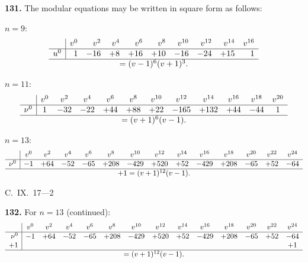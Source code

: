 \documentclass[11pt,a4paper]{book}
\begin{document}
\newpage
\noindent\textbf{131.} The modular equations may be written in square form as follows:

\medskip
$n = 9$:
\[
\begin{array}{r|rrrrrrrrr}
& v^0 & v^2 & v^4 & v^6 & v^8 & v^{10} & v^{12} & v^{14} & v^{16} \\
\hline
u^0 & 1 & -16 & +8 & +16 & +10 & -16 & -24 & +15 & 1 \\
\hline
\multicolumn{10}{c}{= (v - 1)^6(v + 1)^3.}
\end{array}
\]

\medskip
$n = 11$:
\[
\begin{array}{r|ccccccccccc}
& v^0 & v^2 & v^4 & v^6 & v^8 & v^{10} & v^{12} & v^{14} & v^{16} & v^{18} & v^{20} \\
\hline
\nu^0 & 1 & -32 & -22 & +44 & +88 & +22 & -165 & +132 & +44 & -44 & 1 \\
\hline
\multicolumn{12}{c}{= (v + 1)^6(v - 1).}
\end{array}
\]

\medskip
$n = 13$:
\[
\begin{array}{r|ccccccccccccc}
& v^0 & v^2 & v^4 & v^6 & v^8 & v^{10} & v^{12} & v^{14} & v^{16} & v^{18} & v^{20} & v^{22} & v^{24} \\
\hline
\nu^0 & -1 & +64 & -52 & -65 & +208 & -429 & +520 & +52 & -429 & +208 & -65 & +52 & -64 \\
\hline
\multicolumn{14}{c}{+ 1 = (v + 1)^{12}(v - 1).}
\end{array}
\]

\begin{flushright}
C.~IX.~17---2
\end{flushright}


\noindent\textbf{132.} For $n = 13$ (continued):
\[
\begin{array}{r|ccccccccccccc}
& v^0 & v^2 & v^4 & v^6 & v^8 & v^{10} & v^{12} & v^{14} & v^{16} & v^{18} & v^{20} & v^{22} & v^{24} \\
\hline
\nu^0 & -1 & +64 & -52 & -65 & +208 & -429 & +520 & +52 & -429 & +208 & -65 & +52 & -64 \\
+1 & & & & & & & & & & & & & +1 \\
\hline
\multicolumn{14}{c}{= (v + 1)^{12}(v - 1).}
\end{array}
\]
\end{document}
